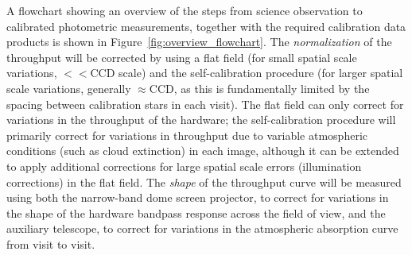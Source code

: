 \documentclass[12pt,preprint]{aastex}
\begin{document}
A flowchart showing an overview of the steps from science observation
to calibrated photometric measurements, together with the required
calibration data products is shown in
Figure~\ref{fig:overview_flowchart}.  The {\it normalization} of the
throughput will be corrected by using a flat field (for small spatial
scale variations, $<<$CCD scale) and the self-calibration procedure
(for larger spatial scale variations, generally $\approx$CCD, as this
is fundamentally limited by the spacing between calibration stars in
each visit). The flat field can only correct for variations in the
throughput of the hardware; the self-calibration procedure will
primarily correct for variations in throughput due to variable
atmospheric conditions (such as cloud extinction) in each image,
although it can be extended to apply additional corrections for large
spatial scale errors (illumination corrections) in the flat field. The
{\it shape} of the throughput curve will be measured using both the
narrow-band dome screen projector, to correct for variations in the
shape of the hardware bandpass response across the field of view, and
the auxiliary telescope, to correct for variations in the atmospheric
absorption curve from visit to visit.
\end{document}
